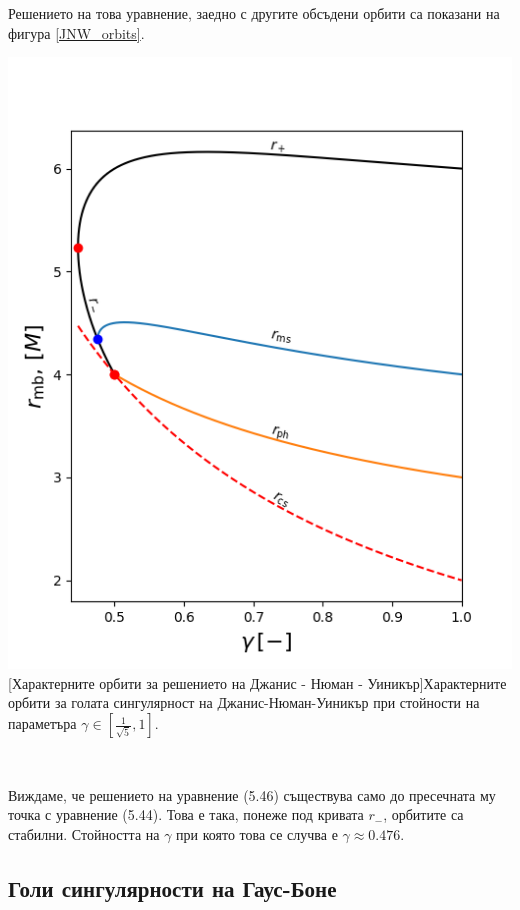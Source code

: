 Решението на това уравнение, заедно с другите обсъдени орбити са показани на фигура \ref{JNW_orbits}.\\
\begin{minipage}{14em}
	\hspace{-0.3cm}
	\includegraphics[scale = 0.45]{JNW_orbits.png}
	[Характерните орбити за решението на Джанис - Нюман - Уиникър]{\small Характерните орбити за голата сингулярност на Джанис-Нюман-Уиникър при стойности на параметъра $\gamma \in [\frac{1}{\sqrt{5}}, 1]$.}
	\label{JNW_orbits}
\end{minipage}\,\,\,
\begin{minipage}{20em}
Виждаме, че решението на уравнение (5.46) съществува само до пресечната му точка с уравнение (5.44). Това е така, понеже под кривата $r_-$, орбитите са стабилни. Стойността на $\gamma$ при която това се случва е $\gamma\approx 0.476$.

\end{minipage}
\newpage
\subsection{Голи сингулярности на Гаус-Боне}
